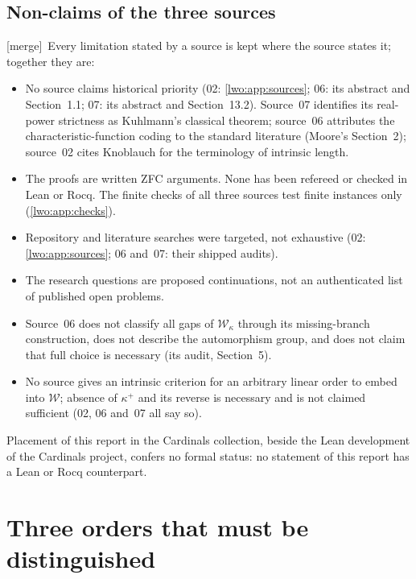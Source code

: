 \documentclass[11pt,a4paper]{article}
\theoremstyle{definition}
\theoremstyle{remark}
\newcommand{\W}{\mathcal W}
\newcommand{\merge}{\textsf{[merge]}}
\begin{document}
\subsection{Non-claims of the three sources}\label{lwo:sec:nonclaims}
\merge\ Every limitation stated by a source is kept where the source states
it; together they are:
\begin{itemize}
\item No source claims historical priority (02: \cref{lwo:app:sources};
06: its abstract and Section~1.1; 07: its abstract and Section~13.2).
Source~07 identifies its real-power strictness as Kuhlmann's classical
theorem; source~06 attributes the characteristic-function coding to the
standard literature (Moore's Section~2); source~02 cites Knoblauch for the
terminology of intrinsic length.
\item The proofs are written ZFC arguments. None has been refereed or checked
in Lean or Rocq. The finite checks of all three sources test finite instances
only (\cref{lwo:app:checks}).
\item Repository and literature searches were targeted, not exhaustive
(02: \cref{lwo:app:sources}; 06 and~07: their shipped audits).
\item The research questions are proposed continuations, not an authenticated
list of published open problems.
\item Source~06 does not classify all gaps of $\W_\kappa$ through its
missing-branch construction, does not describe the automorphism group, and
does not claim that full choice is necessary (its audit, Section~5).
\item No source gives an intrinsic criterion for an arbitrary linear order to
embed into $\W$; absence of $\kappa^+$ and its reverse is necessary and is not
claimed sufficient (02, 06 and~07 all say so).
\end{itemize}
Placement of this report in the Cardinals collection, beside the Lean
development of the Cardinals project, confers no formal status: no statement
of this report has a Lean or Rocq counterpart.

\section{Three orders that must be distinguished}\label{lwo:sec:three}
\end{document}
